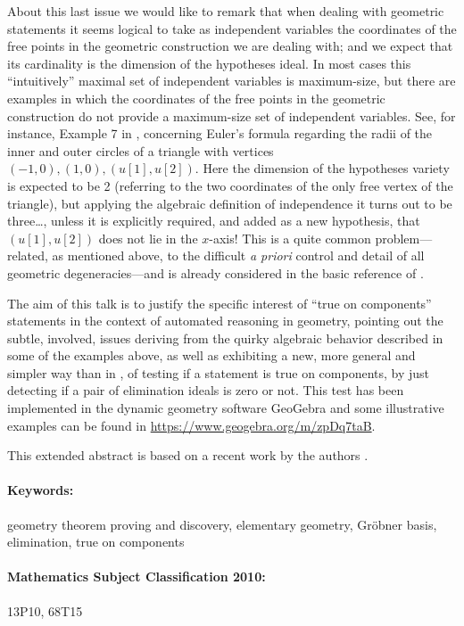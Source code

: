 \documentclass{article}
\newcommand{\KEYWORDS}[1]{\paragraph{Keywords:} #1}
\newcommand{\MSCLASSIFICATION}[1]{\paragraph{Mathematics Subject Classification 2010:} #1}
\begin{document}
  About this last issue we would like to remark that when dealing with geometric statements it seems logical to take as independent variables the coordinates of the free points in the geometric construction we are dealing with; and we expect that its cardinality is the dimension of the hypotheses ideal. In most cases this ``intuitively'' maximal set of independent variables is maximum-size, but there are examples in which the coordinates of the free points in the geometric construction do not provide a maximum-size set of independent variables. See,  for instance,  Example 7 in \cite{DR}, concerning Euler's formula regarding the radii of the inner and outer circles of a triangle with vertices $(-1,0),(1,0), (u[1],u[2])$. Here the dimension of the hypotheses variety is expected to be 2 (referring to the two coordinates of the only free vertex of the triangle), but applying the algebraic definition of independence it turns out to be three\dots , unless it is explicitly required, and added as a  new hypothesis, that $(u[1],u[2])$ does not lie in the $x$-axis! This is a quite common problem---related, as mentioned above, to the difficult  \emph{a priori} control and detail of all geometric degeneracies---and is already considered in the basic reference of \cite{Chou}.  
  
 
The aim of this talk is to justify the specific interest of ``true on components'' statements in the context of automated reasoning in geometry,  pointing out the subtle, involved, issues deriving from the  quirky algebraic behavior described in some of the examples above, as well as  exhibiting a new, more general and simpler way than in \cite{ZWS},  of testing if a statement is true on  components, by just detecting if a pair of elimination ideals is zero or not. This test has been implemented in the dynamic geometry software GeoGebra and some  illustrative examples can be found in \url{https://www.geogebra.org/m/zpDq7taB}. 
  
This extended abstract is  based on a recent work by the authors  \cite{KRV}.



\KEYWORDS{geometry theorem proving and discovery, elementary geometry, Gr\"obner basis, elimination, true on components}


\MSCLASSIFICATION{13P10, 68T15}



\end{document}
